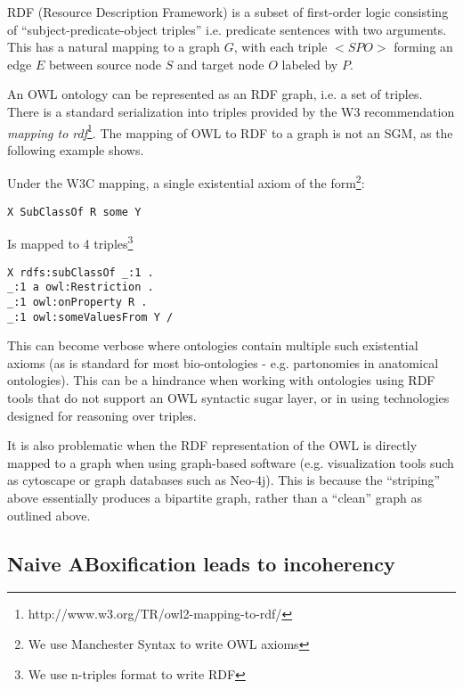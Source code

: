 \documentclass{my}
\begin{document}
RDF (Resource Description Framework) is a subset of first-order logic
consisting of ``subject-predicate-object triples'' i.e. predicate
sentences with two arguments. This has a natural mapping to a graph
$G$, with each triple $<S P O>$ forming an edge $E$ between source
node $S$ and target node $O$ labeled by $P$.

An OWL ontology can be represented as an RDF graph, i.e. a set of
triples. There is a standard serialization into triples provided by
the W3 recommendation \emph{mapping to
  rdf}\footnote{http://www.w3.org/TR/owl2-mapping-to-rdf/}. The
mapping of OWL to RDF to a graph is not an SGM, as the following
example shows.

Under the W3C mapping, a single existential axiom of the
form\footnote{We use Manchester Syntax to write OWL axioms}:

\begin{verbatim}
X SubClassOf R some Y
\end{verbatim}

Is mapped to 4 triples\footnote{We use n-triples format to write RDF}

\begin{verbatim}
X rdfs:subClassOf _:1 .
_:1 a owl:Restriction .
_:1 owl:onProperty R .
_:1 owl:someValuesFrom Y /
\end{verbatim}

This can become verbose where ontologies contain multiple such
existential axioms (as is standard for most bio-ontologies -
e.g. partonomies in anatomical ontologies). This can be a hindrance
when working with ontologies using RDF tools that do not support an
OWL syntactic sugar layer, or in using technologies designed for
reasoning over triples.

It is also problematic when the RDF representation of the OWL is
directly mapped to a graph when using graph-based software
(e.g. visualization tools such as cytoscape or graph databases such as
Neo-4j). This is because the ``striping'' above essentially produces a
bipartite graph, rather than a ``clean'' graph as outlined above.


\subsection{Naive ABoxification leads to incoherency}
\end{document}
